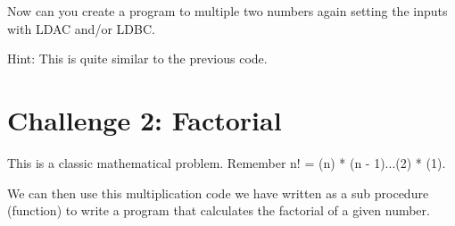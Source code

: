 \documentclass[10pt,a4paper]{article}
\begin{document}
Now can you create a program to multiple two numbers again setting the inputs with LDAC and/or LDBC.

Hint: This is quite similar to the previous code.

\section{Challenge 2: Factorial}

This is a classic mathematical problem. Remember n! = (n) * (n - 1)...(2) * (1).

We can then use this multiplication code we have written as a sub procedure (function) to write a program that calculates the factorial of a
given number.
\end{document}
